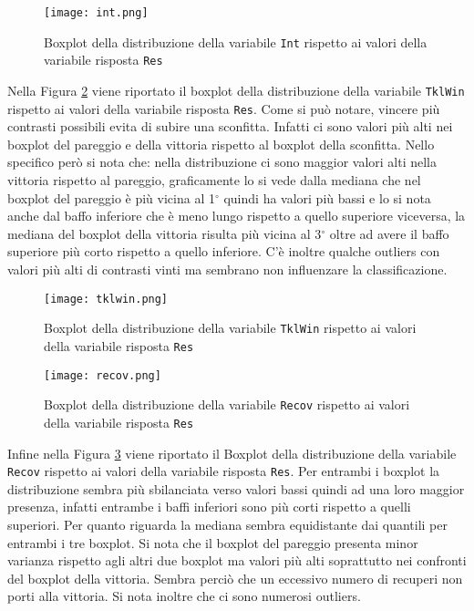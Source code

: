 \begin{figure}[htbp]
	\begin{center}
		\texttt{[image: int.png]}
		\caption{Boxplot della distribuzione della variabile \texttt{Int} rispetto ai valori della variabile risposta \texttt{Res}} \label{fig:int}
	\end{center}
\end{figure}

Nella Figura \ref{fig:tkl} viene riportato il boxplot della distribuzione della variabile \texttt{TklWin} rispetto ai valori della variabile risposta \texttt{Res}. Come si può notare, vincere più contrasti possibili evita di subire una sconfitta. Infatti ci sono valori più alti nei boxplot del pareggio e della vittoria rispetto al boxplot della sconfitta. Nello specifico però si nota che: nella distribuzione ci sono maggior valori alti nella vittoria rispetto al pareggio, graficamente lo si vede dalla mediana che nel boxplot del pareggio è più vicina al 1$^{\circ}$ quindi ha valori più bassi e lo si nota anche dal baffo inferiore che è meno lungo rispetto a quello superiore viceversa, la mediana del boxplot della vittoria risulta più vicina al 3$^{\circ}$ oltre ad avere il baffo superiore più corto rispetto a quello inferiore. C'è inoltre qualche outliers con valori più alti di contrasti vinti ma sembrano non influenzare la classificazione.\\

\begin{figure}[htbp]
	\begin{center}
		\texttt{[image: tklwin.png]}
		\caption{Boxplot della distribuzione della variabile \texttt{TklWin} rispetto ai valori della variabile risposta \texttt{Res}} \label{fig:tkl}
	\end{center}
\end{figure}

\begin{figure}[htbp]
	\begin{center}
		\texttt{[image: recov.png]}
		\caption{Boxplot della distribuzione della variabile \texttt{Recov} rispetto ai valori della variabile risposta \texttt{Res}} \label{fig:recov}
	\end{center}
\end{figure} 

Infine nella Figura \ref{fig:recov} viene riportato il Boxplot della distribuzione della variabile \texttt{Recov} rispetto ai valori della variabile risposta \texttt{Res}. Per entrambi i boxplot la distribuzione sembra più sbilanciata verso valori bassi quindi ad una loro maggior presenza, infatti entrambe i baffi inferiori sono più corti rispetto a quelli superiori. Per quanto riguarda la mediana sembra equidistante dai quantili per entrambi i tre boxplot. Si nota che il boxplot del pareggio presenta minor varianza rispetto agli altri due boxplot ma valori più alti soprattutto nei confronti del boxplot della vittoria. Sembra perciò che un eccessivo numero di recuperi non porti alla vittoria. Si nota inoltre che ci sono numerosi outliers.

